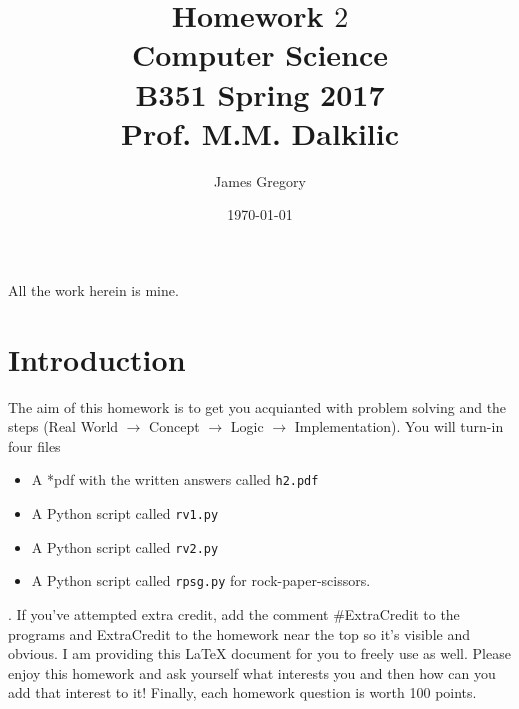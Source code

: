 \documentclass{article}
\begin{document}
\title{Homework $2$\\ Computer Science \\ B351 Spring 2017\\ Prof. M.M. Dalkilic}         %
\author{James Gregory}        %
\date{\today}          %
\maketitle


\makeatother     %




\pagestyle{plain}
All the work herein is mine.
\section*{Introduction}
The aim of this homework is to get you acquianted with problem solving and the steps  (Real World $\rightarrow$ Concept $\rightarrow$ Logic  $\rightarrow$ Implementation).  You will turn-in four files\begin{itemize} \item A *pdf with the written answers called \texttt{h2.pdf} \item A Python script called \texttt{rv1.py} \item  A Python script called  \texttt{rv2.py} \item A Python script called \texttt{rpsg.py} for rock-paper-scissors.\end{itemize}.  If you've attempted extra credit, add the comment \#ExtraCredit to the programs and ExtraCredit to the homework near the top so it's visible and obvious.  I am providing this \LaTeX{} document for you to freely use as well. Please enjoy this homework and ask yourself what interests you and then how can you add that interest to it!  Finally, each homework question is worth 100 points.
\newpage
\end{document}
